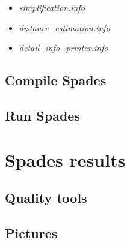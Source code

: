 \documentclass[a4paper,10pt]{article}
\begin{document}
\begin{itemize}
\item {\it simplification.info}


\item {\it distance\_estimation.info}
\item {\it detail\_info\_printer.info}
\end{itemize}


\subsection{Compile Spades}

\subsection{Run Spades}

\section{Spades results}
\subsection{Quality tools}
\subsection{Pictures}
\end{document}
